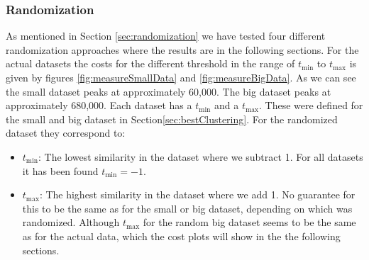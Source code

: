 \documentclass[a4paper,10pt]{article}
\theoremstyle{plain}
\theoremstyle{definition}
\begin{document}
\subsubsection{Randomization}
As mentioned in Section \ref{sec:randomization} we have tested four different randomization approaches where the results are in the following sections.
For the actual datasets the costs for the different threshold in the range of $t_{\min}$ to $t_{\max}$ is given by figures \ref{fig:measureSmallData} and \ref{fig:measureBigData}. As we can see the small dataset peaks at approximately 60,000. The big dataset peaks at approximately 680,000. 
Each dataset has a $t_{\min}$ and a $t_{\max}$. These were defined for the small and big dataset in Section\ref{sec:bestClustering}. For the randomized dataset they correspond to:
\begin{itemize}
	\item $t_{\min}$: The lowest similarity in the dataset where we subtract 1. For all datasets it has been found $t_{\min} = -1$.
	\item $t_{\max}$: The highest similarity in the dataset where we add 1. No guarantee for this to be the same as for the small or big dataset, depending on which was randomized. Although $t_{\max}$ for the random big dataset seems to be the same as for the actual data, which the cost plots will show in the the following sections.
\end{itemize}
\end{document}

